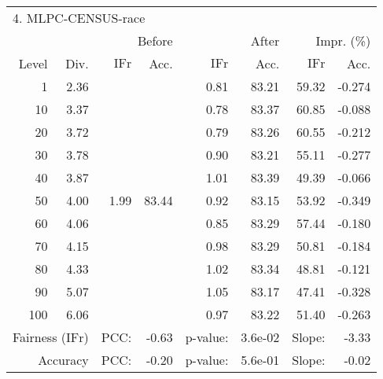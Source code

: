 \begin{tabular}{rr||rr|rr|rr}
\multicolumn{4}{l}{4. MLPC-CENSUS-race} & \multicolumn{2}{c}{} & \multicolumn{2}{c}{}\\
 &  & \multicolumn{2}{r|}{Before} & \multicolumn{2}{r|}{After} & \multicolumn{2}{r}{Impr. (\%)}\\
Level & Div. & $\mathrm{IFr}$ & Acc. & $\mathrm{IFr}$ & Acc. & $\mathrm{IFr}$ & Acc.\\
\hline
1 & 2.36 & \multirow{11}{*}{1.99} & \multirow{11}{*}{83.44} & 0.81 & 83.21 & 59.32 & -0.274\\
10 & 3.37 &  &  & 0.78 & 83.37 & 60.85 & -0.088\\
20 & 3.72 &  &  & 0.79 & 83.26 & 60.55 & -0.212\\
30 & 3.78 &  &  & 0.90 & 83.21 & 55.11 & -0.277\\
40 & 3.87 &  &  & 1.01 & 83.39 & 49.39 & -0.066\\
50 & 4.00 &  &  & 0.92 & 83.15 & 53.92 & -0.349\\
60 & 4.06 &  &  & 0.85 & 83.29 & 57.44 & -0.180\\
70 & 4.15 &  &  & 0.98 & 83.29 & 50.81 & -0.184\\
80 & 4.33 &  &  & 1.02 & 83.34 & 48.81 & -0.121\\
90 & 5.07 &  &  & 1.05 & 83.17 & 47.41 & -0.328\\
100 & 6.06 &  &  & 0.97 & 83.22 & 51.40 & -0.263\\
\hline
\multicolumn{2}{r}{Fairness ($\mathrm{IFr}$)} & PCC: & \multicolumn{1}{r}{-0.63} & p-value:  & \multicolumn{1}{r}{3.6e-02} & Slope:  & -3.33\\
\multicolumn{2}{r}{Accuracy} & PCC: & \multicolumn{1}{r}{-0.20} & p-value:  & \multicolumn{1}{r}{5.6e-01} & Slope:  & -0.02\\
\end{tabular}
